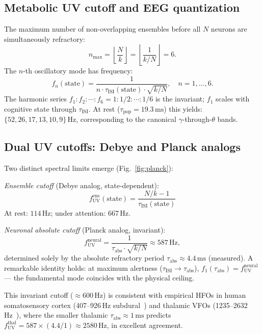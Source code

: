 \documentclass[aps,pre,twocolumn,showpacs,superscriptaddress,longbibliography]{revtex4-2}
\newcommand{\kN}{k/N}
\newcommand{\taupop}{\tau_{\mathrm{pop}}}
\newcommand{\tauISI}{\tau_{\mathrm{ISI}}}
\newcommand{\tauabs}{\tau_{\mathrm{abs}}}
\newcommand{\fUV}{f_{\mathrm{UV}}}
\begin{document}
\subsection{Metabolic UV cutoff and EEG quantization}

The maximum number of non-overlapping ensembles before all $N$
neurons are simultaneously refractory:
\begin{equation}
  n_{\max} = \left\lfloor\frac{N}{k}\right\rfloor
           = \left\lfloor\frac{1}{\kN}\right\rfloor = 6.
  \label{eq:nmax}
\end{equation}
The $n$-th oscillatory mode has frequency:
\begin{equation}
  f_n(\mathrm{state}) = \frac{1}{n\cdot\tauISI(\mathrm{state})\cdot\sqrt{\kN}},
  \quad n = 1,\ldots,6.
  \label{eq:fn}
\end{equation}
The harmonic series $f_1:f_2:\cdots:f_6 = 1:1/2:\cdots:1/6$
is the invariant; $f_1$ scales with cognitive state through $\tauISI$.
At rest ($\taupop = 19.3\,\mathrm{ms}$) this yields:
$\{52, 26, 17, 13, 10, 9\}\,\mathrm{Hz}$, corresponding to the
canonical $\gamma$-through-$\theta$ bands.

\subsection{Dual UV cutoffs: Debye and Planck analogs}

Two distinct spectral limits emerge (Fig.~\ref{fig:planck}):

\textit{Ensemble cutoff} (Debye analog, state-dependent):
\begin{equation}
  \fUV^{\mathrm{ens}}(\mathrm{state}) = \frac{N/k-1}{\tauISI(\mathrm{state})}
  \label{eq:fUV_ens}
\end{equation}
At rest: $114\,\mathrm{Hz}$; under attention: $667\,\mathrm{Hz}$.

\textit{Neuronal absolute cutoff} (Planck analog, invariant):
\begin{equation}
  \fUV^{\mathrm{neural}} = \frac{1}{\tauabs\cdot\sqrt{\kN}}
  \approx 587\,\mathrm{Hz},
  \label{eq:fUV_neural}
\end{equation}
determined solely by the absolute refractory period
$\tauabs \approx 4.4\,\mathrm{ms}$ (measured). A remarkable
identity holds: at maximum alertness
($\tauISI \to \tauabs$), $f_1(\tauabs) = \fUV^{\mathrm{neural}}$
--- the fundamental mode coincides with the physical ceiling.

This invariant cutoff ($\approx 600\,\mathrm{Hz}$) is consistent
with empirical HFOs in human somatosensory cortex (407--926\,Hz
subdural~\cite{Hashimoto2009}) and thalamic VFOs
(1235--2632\,Hz~\cite{Hashimoto2009}), where the smaller thalamic
$\tauabs \approx 1\,\mathrm{ms}$ predicts
$\fUV^{\mathrm{thal}} = 587 \times (4.4/1) \approx 2580\,\mathrm{Hz}$,
in excellent agreement.
\end{document}
